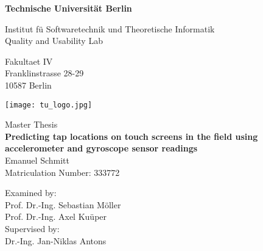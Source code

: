 \thispagestyle{empty}
\begin{center}

\vspace*{1.0cm}
{\LARGE \textbf{Technische Universit{\"a}t Berlin}}

\vspace{0.5cm}

{\large Institut f{\"u} Softwaretechnik und Theoretische Informatik\\[1mm]}
{\large Quality and Usability Lab\\[5mm]}

Fakultaet IV\\
Franklinstrasse 28-29\\
10587 Berlin\\

\vspace*{1cm}

\texttt{[image: tu\_logo.jpg]}

\vspace*{1.0cm}

{\LARGE Master Thesis}\\

\vspace{1.0cm}
{\LARGE \textbf{Predicting tap locations on touch screens in the field using accelerometer and gyroscope sensor readings}}\\
\vspace*{1.0cm}
{\LARGE Emanuel Schmitt}
\\
\vspace*{0.5cm}
Matriculation Number: 333772\\
\vspace*{1.0cm}

Examined by:\\
Prof. Dr.-Ing. Sebastian M{\"o}ller\\
Prof. Dr.-Ing. Axel Ku{\"u}per\\
\vspace*{0.3cm}
Supervised by:\\
Dr.-Ing. Jan-Niklas Antons
\vspace{3cm}


\end{center}

